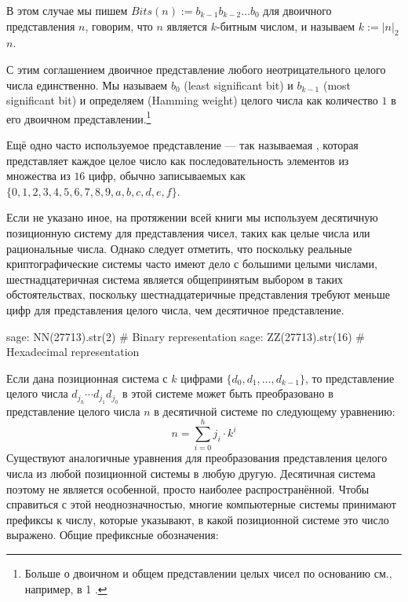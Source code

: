 В этом случае мы пишем $Bits(n):= b_{k-1}b_{k-2}\ldots b_{0}$ для двоичного представления $n$, говорим, что $n$ является $k$-битным числом, и называем $k:= |n|_2$  $n$.

С этим соглашением двоичное представление любого неотрицательного целого числа единственно. Мы называем $b_0$  (least significant bit) и $b_{k-1}$  (most significant bit) и определяем  (Hamming weight) целого числа как количество $1$ в его двоичном представлении.\footnote{Больше о двоичном и общем представлении целых чисел по основанию см., например, в \chaptname{} 1 \cite{mignotte-1992}.}

Ещё одно часто используемое представление — так называемая , которая представляет каждое целое число как последовательность элементов из множества из $16$ цифр, обычно записываемых как $\{0,1,2,3,4,5,6,7,8,9,a,b,c,d,e,f\}$.

Если не указано иное, на протяжении всей книги мы используем десятичную позиционную систему для представления чисел, таких как целые числа или рациональные числа. Однако следует отметить, что поскольку реальные криптографические системы часто имеют дело с большими целыми числами, шестнадцатеричная система является общепринятым выбором в таких обстоятельствах, поскольку шестнадцатеричные представления требуют меньше цифр для представления целого числа, чем десятичное представление.
\begin{sagecommandline}
sage: NN(27713).str(2) # Binary representation
sage: ZZ(27713).str(16) # Hexadecimal representation
\end{sagecommandline}
Если дана позиционная система с $k$ цифрами $\{d_0,d_1,\ldots, d_{k-1}\}$, то представление целого числа $d_{j_h}\cdots d_{j_1} d_{j_0}$ в этой системе может быть преобразовано в 
представление целого числа $n$ в десятичной системе по следующему уравнению:
\begin{equation}
\label{eq:from-k-digits-to-deci}
n = \sum_{i=0}^h j_i\cdot k^{i}
\end{equation}
Существуют аналогичные уравнения для преобразования представления целого числа из любой позиционной системы в любую другую. Десятичная система поэтому не является особенной, просто наиболее распространённой. Чтобы справиться с этой неоднозначностью, многие компьютерные системы принимают префиксы к числу, которые указывают, в какой позиционной системе это число выражено. Общие префиксные обозначения:
 
